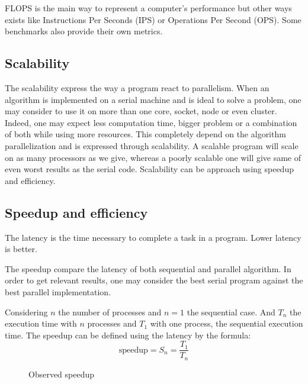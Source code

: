 FLOPS is the main way to represent a computer's performance but other ways exists like Instructions Per Seconds (IPS) or Operations Per Second (OPS).
Some benchmarks also provide their own metrics. 

\subsection{Scalability}
The scalability express the way a program react to parallelism. 
When an algorithm is implemented on a serial machine and is ideal to solve a problem, one may consider to use it on more than one core, socket, node or even cluster. 
Indeed, one may expect less computation time, bigger problem or a combination of both while using more resources. 
This completely depend on the algorithm parallelization and is expressed through scalability. 
A scalable program will scale on as many processors as we give, whereas a poorly scalable one will give same of even worst results as the serial code.  
Scalability can be approach using speedup and efficiency.

\subsection{Speedup and efficiency}
The latency is the time necessary to complete a task in a program.
Lower latency is better. 

The speedup compare the latency of both sequential and parallel algorithm. 
In order to get relevant results, one may consider the best serial program against the best parallel implementation.

Considering $n$ the number of processes and $n=1$ the sequential case.
And $T_n$ the execution time with $n$ processes and $T_1$ with one process, the sequential execution time. 
The speedup can be defined using the latency by the formula: 
\begin{equation}
\text{speedup} = S_n =  \frac{T_1}{T_n}
\end{equation}

\begin{figure}
\centering 
{}
\caption{Observed speedup}
\label{fig:1_HPC:speedup_obs}
\end{figure}

